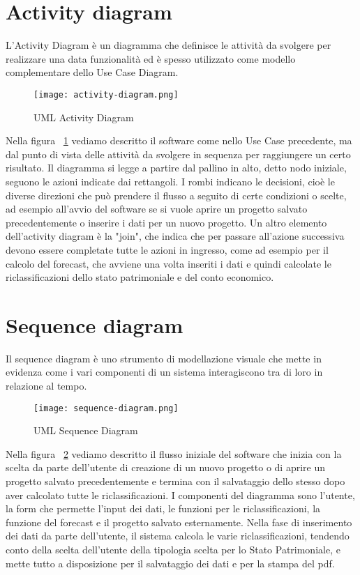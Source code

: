 
\newpage

\section{Activity diagram}

L'Activity Diagram è un diagramma che definisce le attività da svolgere per realizzare una data funzionalità ed è spesso utilizzato come modello complementare dello Use Case Diagram.

\begin{figure}[H]
    \centering
    \texttt{[image: activity-diagram.png]}
    \caption{UML Activity Diagram}
    \label{fig:ActivityDiagram1}
\end{figure}

Nella figura ~\ref{fig:ActivityDiagram1} vediamo descritto il software come nello Use Case precedente, ma dal punto di vista delle attività da svolgere in sequenza per raggiungere un certo risultato.
Il diagramma si legge a partire dal pallino in alto, detto nodo iniziale, seguono le azioni indicate dai rettangoli.
I rombi indicano le decisioni, cioè le diverse direzioni che può prendere il flusso a seguito di certe condizioni o scelte, ad esempio all'avvio del software se si vuole aprire un progetto salvato precedentemente o inserire i dati per un nuovo progetto.
Un altro elemento dell'activity diagram è la "join", che indica che per passare all'azione successiva devono essere completate tutte le azioni in ingresso, come ad esempio per il calcolo del forecast, che avviene una volta inseriti i dati e quindi calcolate le riclassificazioni dello
stato patrimoniale e del conto economico.


\newpage

\section{Sequence diagram}

Il sequence diagram è uno strumento di modellazione visuale che mette in evidenza come i vari componenti di un sistema interagiscono tra di loro in relazione al tempo.

\begin{figure}[H]
    \centering
    \texttt{[image: sequence-diagram.png]}
    \caption{UML Sequence Diagram}
    \label{fig:SequenceDiagram}
\end{figure}

Nella figura ~\ref{fig:SequenceDiagram} vediamo descritto il flusso iniziale del software che inizia con la scelta da parte dell'utente di creazione di un nuovo progetto o di aprire un progetto salvato precedentemente e termina con il salvataggio dello stesso dopo aver calcolato tutte le riclassificazioni.
I componenti del diagramma sono l'utente, la form che permette l'input dei dati, le funzioni per le riclassificazioni, la funzione del forecast e il progetto salvato esternamente.
Nella fase di inserimento dei dati da parte dell'utente, il sistema calcola le varie riclassificazioni, tendendo conto della scelta dell'utente della tipologia scelta per lo Stato Patrimoniale, e mette tutto a disposizione per il salvataggio dei dati e per la stampa del pdf.